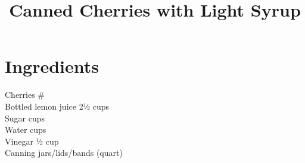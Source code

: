 \documentclass[11pt,letterpaper]{article}
\title{Canned Cherries with Light Syrup}
\author{}
\date{}
\begin{document}
\maketitle
\thispagestyle{empty}

\section*{Ingredients}
\setlength{\columnsep}{20pt}
\begin{multicols}{2}
\noindent
    Cherries \# \\
    Bottled lemon juice \dotfill 2½ cups \\
    Sugar  cups \\
    Water  cups \\
    Vinegar \dotfill ½ cup \\
    Canning jars/lids/bands (quart)  \\
\end{multicols}
\end{document}
